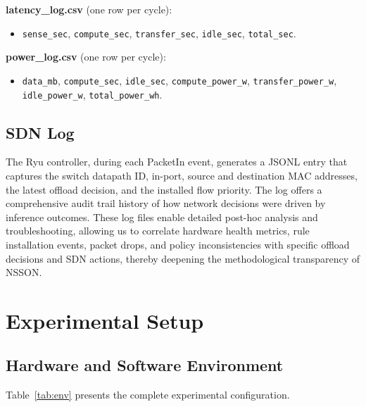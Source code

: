 \documentclass[journal]{IEEEtran}
\begin{document}
\textbf{latency\_log.csv} (one row per cycle):
\begin{itemize}
\item \texttt{sense\_sec}, \texttt{compute\_sec}, \texttt{transfer\_sec},
  \texttt{idle\_sec}, \texttt{total\_sec}.
\end{itemize}

\textbf{power\_log.csv} (one row per cycle):
\begin{itemize}
\item \texttt{data\_mb}, \texttt{compute\_sec}, \texttt{idle\_sec},
  \texttt{compute\_power\_w}, \texttt{transfer\_power\_w},
  \texttt{idle\_power\_w}, \texttt{total\_power\_wh}.
\end{itemize}

\subsection{SDN Log}
The Ryu controller, during each PacketIn event, generates a JSONL entry that captures the switch datapath ID, in-port, source and destination MAC addresses, the latest offload decision, and the installed flow priority. The log offers a comprehensive audit trail history of how network decisions were driven by inference outcomes.
These log files enable detailed post-hoc analysis and troubleshooting, allowing us to correlate hardware health metrics, rule installation events, packet drops, and policy inconsistencies with specific offload decisions and SDN actions, thereby deepening the methodological transparency of NSSON.

\section{Experimental Setup}
\label{sec:setup}

\subsection{Hardware and Software Environment}

Table~\ref{tab:env} presents the complete experimental configuration.
\end{document}
